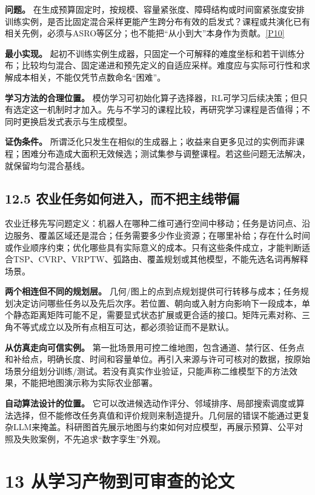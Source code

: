 \textbf{问题。}
在生成预算固定时，按规模、容量紧张度、障碍结构或时间窗紧张度安排训练实例，是否比固定混合采样更能产生跨分布有效的启发式？课程或共演化已有相关先例，必须与ASRO等区分；也不能把``从小到大''本身作为贡献。\href{https://arxiv.org/abs/2601.22896}{{[}P10{]}}

\textbf{最小实现。}
起初不训练实例生成器，只固定一个可解释的难度坐标和若干训练分布；比较均匀混合、固定递进和预先定义的自适应采样。难度应与实际可行性和求解成本相关，不能仅凭节点数命名``困难''。

\textbf{学习方法的合理位置。}
模仿学习可初始化算子选择器，RL可学习后续决策；但只有选定这一机制时才加入。先与不学习的课程比较，再研究学习课程是否值得；不同时更换启发式表示与生成模型。

\textbf{证伪条件。}
所谓泛化只发生在相似的生成器上；收益来自更多见过的实例而非课程；困难分布造成大面积无效候选；测试集参与调整课程。若这些问题无法解决，就保留均匀混合基线。

\subsection{12.5
农业任务如何进入，而不把主线带偏}\label{ux519cux4e1aux4efbux52a1ux5982ux4f55ux8fdbux5165ux800cux4e0dux628aux4e3bux7ebfux5e26ux504f}

农业迁移先写问题定义：机器人在哪种二维可通行空间中移动；任务是访问点、沿边服务、覆盖区域还是混合；任务需要多少作业资源；在哪里补给；存在什么时间或作业顺序约束；优化哪些具有实际意义的成本。只有这些条件成立，才能判断适合TSP、CVRP、VRPTW、弧路由、覆盖规划或其他模型，不能先选名词再解释场景。

\textbf{两个相连但不同的规划层。}
几何/图上的点到点规划提供可行转移与成本；任务规划决定访问哪些任务以及先后次序。若位置、朝向或入射方向影响下一段成本，单个静态距离矩阵可能不足，需要显式状态扩展或更合适的接口。矩阵元素对称、三角不等式成立以及所有点相互可达，都必须验证而不是默认。

\textbf{从仿真走向可信实例。}
第一批场景用可控二维地图，包含通道、禁行区、任务点和补给点，明确长度、时间和容量单位。再引入来源与许可可核对的数据，按原始场景分组划分训练/测试。若没有真实作业验证，只能声称二维模型下的方法效果，不能把地图演示称为实际农业部署。

\textbf{自动算法设计的位置。}
它可以改进候选动作评分、邻域排序、局部搜索调度或算法选择，但不能修改任务真值和评价规则来制造提升。几何层的错误不能通过更复杂LLM来掩盖。科研图首先展示地图与约束如何对应模型，再展示预算、公平对照及失败案例，不先追求``数字孪生''外观。

\section{13
从学习产物到可审查的论文}\label{ux4eceux5b66ux4e60ux4ea7ux7269ux5230ux53efux5ba1ux67e5ux7684ux8bbaux6587}

